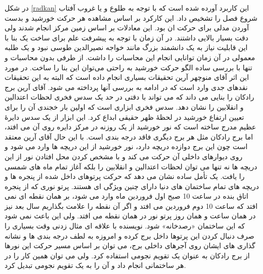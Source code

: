 \documentclass{article}
\begin{document}
	در شکل \ref{radkan}  این کاربرد آورده شده است که با توجه به طلوع و یا غروب آفتاب شروع فصل را تشخیص داد. این کارکرد بر اساس مشاهده هر حرکت خورشید و بدست آوردن مدلی برای حرکت ان بود. این معادلات بر اساس زمین مرکز انجام شدند ولی دقت بسیار بالایی داشتند. در آن زمان با توجه به پیشرفت علم برای ساخت یک بنا با این قابلیت نیاز به یک دانشمند بزرگ مانند خواجه نصیرالدین طوسی نبود و یک طلبه معمولی در آن زمان توانایی انجام این محاسبات را داشت. از طرفی بدون محاسبات و تنها با بررسی ساده الگو حرکت خورشید به راحتی می‌توان این بنا را ساخت.
	در مورد این اثر آقای منوچهر آرین تحقیقات بسیاری انجام داده است که البته به این تحقیقات نقدهای جدی وارد است که در ادامه به بررسی آنها پرداخته می شود.
	\clearpage
آقای آرین 	برج رادکان را بنایی می داند که می تواند با دقتی در حد یک سدس فخری لحظات اعتدالین و انقلابین را نشان دهد. سدس فخری ابزاری است که اولین بار خجندی آن را برای تعیین ارتفاع خورشید در لحظۀ ظهر حقیقی ابداع کرد. این ابزار از یک سدس دایرۀ عظیم مدرج ساخته است که نور خورشید از یک روزنه در مرکز دایره روی آن می افتد، اما برج رادکان مثل هر برج دیگری فاقد درجه بندی است. با این حال آقای آرین  معتقد است چون این برج دوازده دریچه دارد، نور خورشید از این دریچه ها وارد می شود و روی دیوارهای داخلی آن حرکت می کند و با مشخص کردن محل افتادن نور از این دریچه ها نه تنها می توان لحظات اعتدالین و انقلابین را 
بلکه آغاز تمام ماه های شمسی را یافت.
یک تأمل ساده نشان می دهد که حرکت پرتوهای داخل شده از پنجره ها و دریچه های تمام ساختمان های دنیا دارای چنین ویژگی ای هستند. پرتو نوری که از پنجره اتاق بنده در ساعت 10 صبح اول فروردین ماه وارد می شود، بر همان نقطه ای نمی افتد که ساعت 10 دوم فروردین می افتد و اگر آن نقطه را علامت بگذاریم سال بعد نیز در همان ساعت و همان روز پرتو نور در همان نقطه می افتد. ولی این باعث نمی شود که این ساختمان «رصدخانه» شود. نویسنده با علاقه ای مثال زدنی وقت بسیاری را صرف دنبال کردن این پرتوها داخل برج کرده و امروزه به لطف درجه بندی ها و نشانه گذاری های ایشان روی آجرهای داخلی برج، می توان بر اساس مسیر حرکت 
این نورها از برج رادکان به عنوان یک تقویم نجومی استفاده کرد. ولی می توان همین کار را در هر ساختمانی انجام داد و آن را به یک تقویم نجومی تبدیل کرد.



\clearpage
\end{document}
